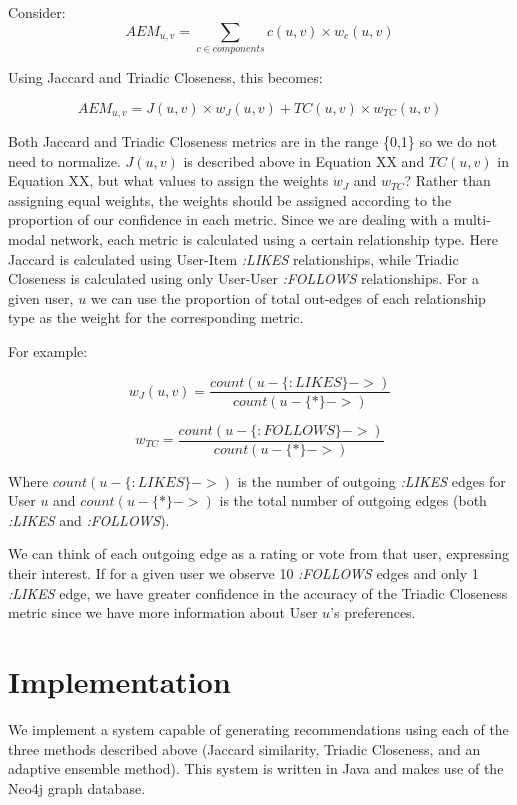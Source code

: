 Consider: 
\begin{equation}
AEM_{u,v} = \sum_{c \in components} c(u, v) \times w_c(u,v)  
\end{equation}

Using Jaccard and Triadic Closeness, this becomes:

\begin{equation}
AEM_{u,v} = J(u,v) \times w_J(u,v) + TC(u,v) \times w_{TC}(u,v)
\end{equation}

Both Jaccard and Triadic Closeness metrics are in the range \{0,1\} so we do not need to normalize.  $J(u,v)$ is described above in Equation XX and $TC(u,v)$ in Equation XX, but what values to assign the weights $w_J$ and $w_{TC}$? Rather than assigning equal weights, the weights should be assigned according to the proportion of our confidence in each metric. Since we are dealing with a multi-modal network, each metric is calculated using a certain relationship type. Here Jaccard is calculated using User-Item \textit{:LIKES} relationships, while Triadic Closeness is calculated using only User-User \textit{:FOLLOWS} relationships. For a given user, $u$ we can use the proportion of total out-edges of each relationship type as the weight for the corresponding metric.

For example:

\begin{equation}
w_J(u,v) = \frac{count(u-\{:LIKES\}->)}{count(u-\{*\}->)}
\end{equation}

\begin{equation}
w_{TC} = \frac{count(u-\{:FOLLOWS\}->)}{count(u-\{*\}->)}
\end{equation}

Where $count(u-\{:LIKES\}->)$ is the number of outgoing \textit{:LIKES} edges for User $u$ and $count(u-\{*\}->)$ is the total number of outgoing edges (both \textit{:LIKES} and \textit{:FOLLOWS}).  

We can think of each outgoing edge as a rating or vote from that user, expressing their interest. If for a given user we observe 10 \textit{:FOLLOWS} edges and only 1 \textit{:LIKES} edge, we have greater confidence in the accuracy of the Triadic Closeness metric since we have more information about User $u$'s preferences. 

\section{Implementation}
We implement a system capable of generating recommendations using each of the three methods described above (Jaccard similarity, Triadic Closeness, and an adaptive ensemble method). This system is written in Java and makes use of the Neo4j graph database.

